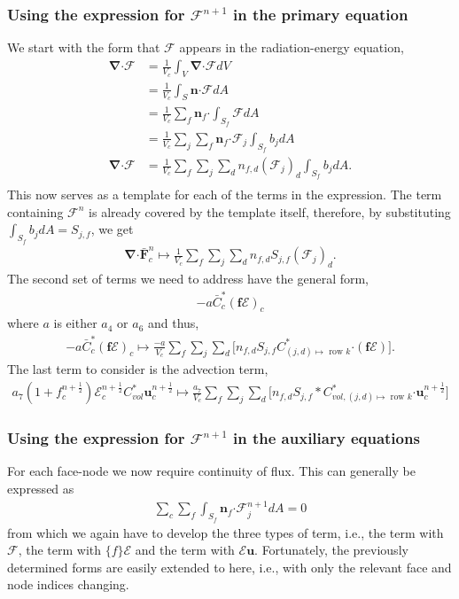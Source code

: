\documentclass[10pt,letterpaper,notitlepage]{article}
\numberwithin{equation}{section}
\newcommand{\bnabla}{\boldsymbol{\nabla}}
\newcommand{\velocity}{\mathbf{u}}
\newcommand{\dotp}{\boldsymbol{\cdot}}
\newcommand{\RadE}{\mathcal{E}}
\newcommand{\RadF}{\boldsymbol{\mathcal{F}}}
\newcommand{\VEFf}{\{ f \}}
\newcommand{\half}{\frac{1}{2}}
\newcommand{\beq}{\begin{equation*} \begin{aligned}}
\newcommand{\eeq}{\end{aligned}\end{equation*}}
\newcommand{\beqn}{\begin{equation}\begin{aligned}}
\newcommand{\eeqn}{\end{aligned}\end{equation}}
\begin{document}
\subsubsection{Using the expression for $\RadF^{n+1}$ in the primary equation}
We start with the form that $\RadF$ appears in the radiation-energy equation, 
\beqn 
\bnabla \dotp \RadF &= \frac{1}{V_c} \int_V \bnabla \dotp \RadF dV \\
&= \frac{1}{V_c} \int_S \mathbf{n} \dotp \RadF dA \\
&= \frac{1}{V_c} \sum_f \mathbf{n}_f \dotp \int_{S_f} \RadF dA\\
&= \frac{1}{V_c} \sum_j \sum_f \mathbf{n}_f \dotp \RadF_j \int_{S_f} b_j dA \\
\bnabla \dotp \RadF 
&= \frac{1}{V_c} \sum_f \sum_j \sum_d n_{f,d} (\RadF_j)_d \int_{S_f} b_j dA. \\
\eeqn 
This now serves as a template for each of the terms in the expression. The term containing $\RadF^n$ is already covered by the template itself, therefore, by substituting $\displaystyle \int_{S_f} b_j dA = S_{j,f}$, we get
\beqn
 \bnabla \dotp \bar{\mathbf{F}}_c^n 
\mapsto
	\frac{1}{V_c} \sum_f \sum_j \sum_d n_{f,d} S_{j,f} (\RadF_j)_d.
\eeqn
The second set of terms we need to address have the general form,
\beq
 - a \bar{C}_c^* (\mathbf{f}\boldsymbol{\RadE})_c
\eeq
where $a$ is either $a_4$ or $a_6$ and thus,
\beqn
- a \bar{C}_c^* (\mathbf{f}\boldsymbol{\RadE})_c
\mapsto
\frac{-a}{V_c} \sum_f \sum_j \sum_d 
\biggr[ 
n_{f,d} S_{j,f} 
C^*_{(j,d)\mapsto  \text{ row }  k} \dotp (\mathbf{f}\boldsymbol{\RadE})
\biggr].
\eeqn 
The last term to consider is the advection term,
\beqn 
a_7 (1+f_c^{n+\half})\RadE_c^{n+\half} C_{vol}^* \velocity_c^{n+\half}
\mapsto
\frac{a_7}{V_c} \sum_f \sum_j \sum_d \biggr[
n_{f,d} S_{j,f} * C_{vol,(j,d)\mapsto \text{ row } k}^* \dotp \velocity_c^{n+\half}
\biggr]
\eeqn 


\subsubsection{Using the expression for $\RadF^{n+1}$ in the auxiliary equations}
For each face-node we now require continuity of flux. This can generally be expressed as
\beqn 
\sum_c \sum_f \int_{S_f} \mathbf{n}_f \dotp \RadF_j^{n+1} dA = 0
\eeqn 
from which we again have to develop the three types of term, i.e., the term with $\RadF$, the term with $\VEFf\RadE$ and the term with $\RadE \velocity$. Fortunately, the previously determined forms are easily extended to here, i.e., with only the relevant face and node indices changing.
\end{document}
